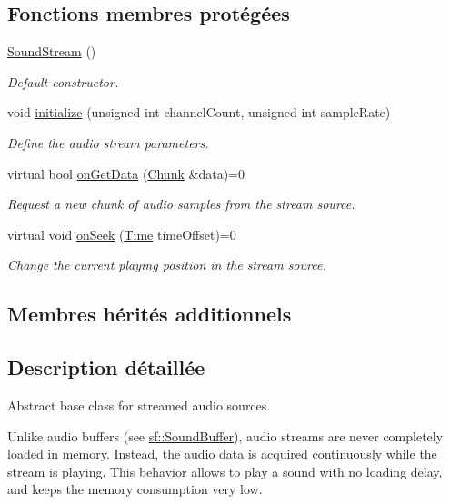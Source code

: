 \subsection*{Fonctions membres protégées}
\begin{DoxyCompactItemize}
\item 
\hyperlink{classsf_1_1SoundStream_a769d08f4c3c6b4340ef3a838329d2e5c}{Sound\+Stream} ()
\begin{DoxyCompactList}\small\item\em Default constructor. \end{DoxyCompactList}\item 
void \hyperlink{classsf_1_1SoundStream_a9c351711198ee1aa77c2fefd3ced4d2c}{initialize} (unsigned int channel\+Count, unsigned int sample\+Rate)
\begin{DoxyCompactList}\small\item\em Define the audio stream parameters. \end{DoxyCompactList}\item 
virtual bool \hyperlink{classsf_1_1SoundStream_a968ec024a6e45490962c8a1121cb7c5f}{on\+Get\+Data} (\hyperlink{structsf_1_1SoundStream_1_1Chunk}{Chunk} \&data)=0
\begin{DoxyCompactList}\small\item\em Request a new chunk of audio samples from the stream source. \end{DoxyCompactList}\item 
virtual void \hyperlink{classsf_1_1SoundStream_a907036dd2ca7d3af5ead316e54b75997}{on\+Seek} (\hyperlink{classsf_1_1Time}{Time} time\+Offset)=0
\begin{DoxyCompactList}\small\item\em Change the current playing position in the stream source. \end{DoxyCompactList}\end{DoxyCompactItemize}
\subsection*{Membres hérités additionnels}


\subsection{Description détaillée}
Abstract base class for streamed audio sources. 

Unlike audio buffers (see \hyperlink{classsf_1_1SoundBuffer}{sf\+::\+Sound\+Buffer}), audio streams are never completely loaded in memory. Instead, the audio data is acquired continuously while the stream is playing. This behavior allows to play a sound with no loading delay, and keeps the memory consumption very low.


